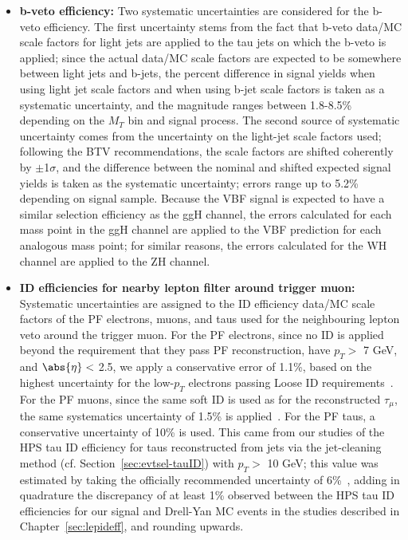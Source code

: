\begin{itemize}
\item \textbf{b-veto efficiency: } Two systematic uncertainties are considered for the b-veto efficiency. The first uncertainty stems from the fact that b-veto data/MC scale factors for light jets are applied to the tau jets on which the b-veto is applied; since the actual data/MC scale factors are expected to be somewhere between light jets and b-jets, the percent difference in signal yields when using light jet scale factors and when using b-jet scale factors is taken as a systematic uncertainty, and the magnitude ranges between 1.8-8.5\% depending on the $M_{T}$ bin and signal process. The second source of systematic uncertainty comes from the uncertainty on the light-jet scale factors used; following the BTV recommendations, the scale factors are shifted coherently by $\pm$1$\sigma$, and the difference between the nominal and shifted expected signal yields is taken as the systematic uncertainty; errors range up to 5.2\% depending on signal sample. Because the VBF signal is expected to have a similar selection efficiency as the ggH channel, the errors calculated for each mass point in the ggH channel are applied to the VBF prediction for each analogous mass point; for similar reasons, the errors calculated for the WH channel are applied to the ZH channel.
\item \textbf{ID efficiencies for nearby lepton filter around trigger muon: } Systematic uncertainties are assigned to the ID efficiency data/MC scale factors of the PF electrons, muons, and taus used for the neighbouring lepton veto around the trigger muon. For the PF electrons, since no ID is applied beyond the requirement that they pass PF reconstruction, have $p_T >$ 7 GeV, and $\abs{\eta} <$ 2.5, we apply a conservative error of 1.1\%, based on the highest uncertainty for the low-$p_T$ electrons passing Loose ID requirements~\cite{CMS:egammauncertaintytwiki}. For the PF muons, since the same soft ID is used as for the reconstructed $\tau_{\mu}$, the same systematics uncertainty of 1.5\% is applied~\cite{CMS:muonuncertaintytwiki}. For the PF taus, a conservative uncertainty of 10\% is used. This came from our studies of the HPS tau ID efficiency for taus reconstructed from jets via the jet-cleaning method (cf. Section~\ref{sec:evtsel-tauID}) with $p_T >$ 10 GeV; this value was estimated by taking the officially recommended uncertainty of 6\%~\cite{CMS:tauuncertaintytwiki}, adding in quadrature the discrepancy of at least 1\% observed between the HPS tau ID efficiencies for our signal and Drell-Yan MC events in the studies described in Chapter~\ref{sec:lepideff}, and rounding upwards.

\end{itemize}

